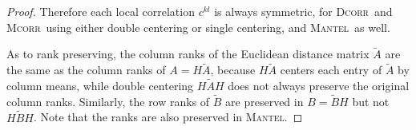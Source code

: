 \documentclass[11pt]{article}
\providecommand{\sct}[1]{{\normalfont\textsc{#1}}}
\newcommand{\G}{c}
\newcommand{\Dcorr}{\sct{Dcorr}}
\newcommand{\Mcorr}{\sct{Mcorr}}
\newcommand{\Mantel}{\sct{Mantel}}
\begin{document}
\begin{proof}
Therefore each local correlation $\G^{kl}$ is always symmetric, for \Dcorr~and \Mcorr~using either double centering or single centering, and \Mantel~as well.

As to rank preserving, the column ranks of the Euclidean distance matrix $\tilde{A}$ are the same as the column ranks of $A=H \tilde{A}$, because $H \tilde{A}$ centers each entry of $\tilde{A}$ by column means, while double centering $H \tilde{A} H$ does not always preserve the original column ranks. Similarly, the row ranks of $\tilde{B}$ are preserved in $B=\tilde{B}H$ but not $H \tilde{B} H$. Note that the ranks are also preserved in \Mantel.
\end{proof}
\end{document}
